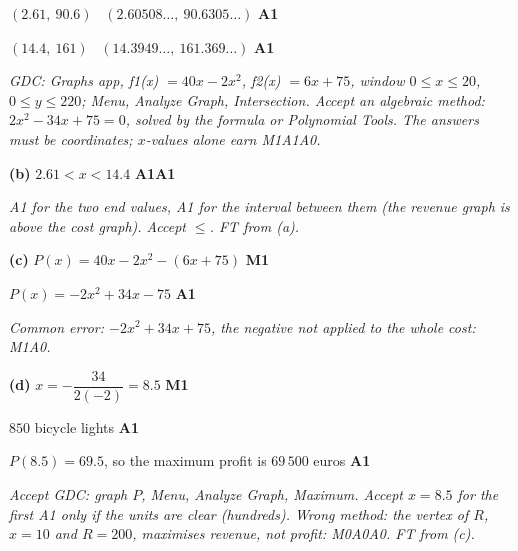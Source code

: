 \documentclass[12pt, twoside]{article}
\begin{document}
\begin{enumerate}[itemsep=0.3cm]
$(2.61,\ 90.6)$ \ $(2.60508\ldots,\ 90.6305\ldots)$ \hfill \textbf{A1}

$(14.4,\ 161)$ \ $(14.3949\ldots,\ 161.369\ldots)$ \hfill \textbf{A1}

\emph{GDC: Graphs app, f1(x) $= 40x - 2x^{2}$, f2(x) $= 6x + 75$, window
$0 \le x \le 20$, $0 \le y \le 220$; Menu, Analyze Graph, Intersection.
Accept an algebraic method: $2x^{2} - 34x + 75 = 0$, solved by the formula
or Polynomial Tools. The answers must be coordinates; $x$-values alone earn
M1A1A0.}

\textbf{(b)} $2.61 < x < 14.4$ \hfill \textbf{A1A1}

\emph{A1 for the two end values, A1 for the interval between them (the
revenue graph is above the cost graph). Accept $\le$. FT from (a).}

\textbf{(c)} $P(x) = 40x - 2x^{2} - (6x + 75)$ \hfill \textbf{M1}

$P(x) = -2x^{2} + 34x - 75$ \hfill \textbf{A1}

\emph{Common error: $-2x^{2} + 34x + 75$, the negative not applied to the
whole cost: M1A0.}

\textbf{(d)} $x = -\dfrac{34}{2(-2)} = 8.5$ \hfill \textbf{M1}

$850$ bicycle lights \hfill \textbf{A1}

$P(8.5) = 69.5$, so the maximum profit is $69\,500$ euros \hfill \textbf{A1}

\emph{Accept GDC: graph $P$, Menu, Analyze Graph, Maximum. Accept $x = 8.5$
for the first A1 only if the units are clear (hundreds). Wrong method: the
vertex of $R$, $x = 10$ and $R = 200$, maximises revenue, not profit:
M0A0A0. FT from (c).}

\end{enumerate}
\end{document}
